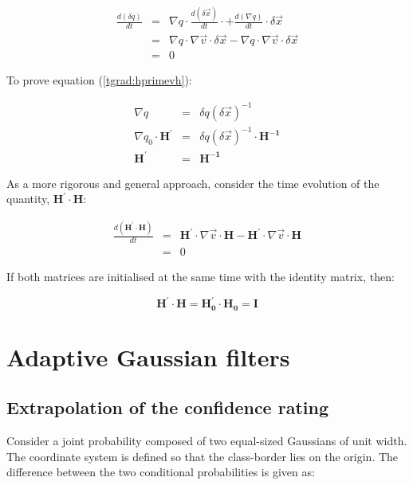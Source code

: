 \documentclass[12pt]{report}
\begin{document}
\begin{flushleft}
\begin{eqnarray}
\frac{d (\delta q)}{dt} & = & \nabla q \cdot \frac{d (\delta \vec x)}{dt} \cdot + 
		\frac{d (\nabla q)}{dt} \cdot \delta \vec x \\
 & = & \nabla q \cdot \nabla \vec v \cdot \delta \vec x - \nabla q \cdot \nabla \vec v \cdot \delta \vec x \\
 & = & 0
\end{eqnarray}

To prove equation (\ref{tgrad:hprimevh}):

\begin{eqnarray}
\nabla q & = & \delta q (\delta \vec x)^{-1} \\
\nabla q_0 \cdot \boldsymbol{H^\prime} & = & \delta q (\delta \vec x)^{-1} \cdot \boldsymbol{H^{-1}}\\
\boldsymbol{H^\prime} & = & \boldsymbol{H^{-1}}
\end{eqnarray}

As a more rigorous and general approach, consider the time evolution of
the quantity, $\boldsymbol{H^\prime} \cdot \boldsymbol{H}$:

\begin{eqnarray}
\frac{d (\boldsymbol{H^\prime} \cdot \boldsymbol{H})}{dt} & = & 
	\boldsymbol{H^\prime} \cdot \nabla \vec v \cdot \boldsymbol{H} -
	\boldsymbol{H^\prime} \cdot \nabla \vec v \cdot \boldsymbol{H} \\
 & = & 0 \nonumber
\end{eqnarray}

If both matrices are initialised at the same time with the identity matrix, then:

\begin{equation}
\boldsymbol{H^\prime} \cdot \boldsymbol{H} = \boldsymbol{H^\prime_0} \cdot \boldsymbol{H_0} = \boldsymbol I
\end{equation}

\section{Adaptive Gaussian filters}

\subsection{Extrapolation of the confidence rating}

Consider a joint probability composed of two equal-sized Gaussians of unit width.
The coordinate system is defined so that the class-border lies on the origin.  The
difference between the two conditional probabilities is given as:


\end{flushleft}
\end{document}
